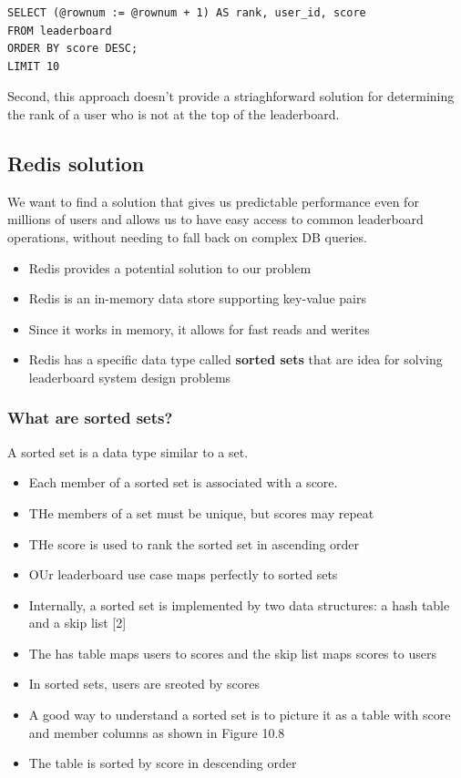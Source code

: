 \documentclass{report}
\theoremstyle{definition}
\let\oldsubsection\subsection
\let\oldsubsubsection\subsubsection
\renewcommand{\subsection}{\oldsubsection*}
\renewcommand{\subsubsection}{\oldsubsubsection*}
\begin{document}
\begin{lstlisting}
SELECT (@rownum := @rownum + 1) AS rank, user_id, score
FROM leaderboard
ORDER BY score DESC;
LIMIT 10
\end{lstlisting}

Second, this approach doesn't provide a striaghforward solution for determining the rank of a user who is not at the top of the leaderboard.

\subsection{Redis solution}

We want to find a solution that gives us predictable performance even for millions of users and allows us to have easy access to common leaderboard operations, without needing to fall back on complex DB queries.

\begin{itemize}
\item
Redis provides a potential solution to our problem
\item
Redis is an in-memory data store supporting key-value pairs
\item
Since it works in memory, it allows for fast reads and werites
\item
Redis has a specific data type called \textbf{sorted sets} that are idea for solving leaderboard system design problems
\end{itemize}

\subsubsection{What are sorted sets?}

A sorted set is a data type similar to a set.

\begin{itemize}
\item
Each member of a sorted set is associated with a score.
\item
THe members of a set must be unique, but scores may repeat
\item
THe score is used to rank the sorted set in ascending order
\item
OUr leaderboard use case maps perfectly to sorted sets
\item
Internally, a sorted set is implemented by two data structures: a hash table and a skip list [2]
\item
The has table maps users to scores and the skip list maps scores to users
\item
In sorted sets, users are sreoted by scores
\item
A good way to understand a sorted set is to picture it as a table with score and member columns as shown in Figure 10.8
\item
The table is sorted by score in descending order
\end{itemize}
\end{document}
